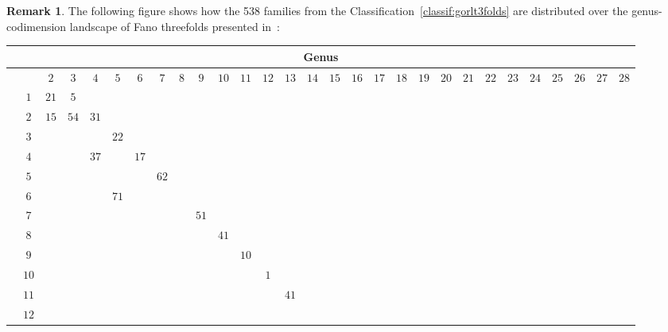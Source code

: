 \documentclass[pdftex]{sigma}%
\theoremstyle{definition}
\newtheorem{rema}[thm]{Remark}
\numberwithin{equation}{section}
\begin{document}
\begin{rema}
The following figure shows how the 538 families from
the Classification~\ref{classif:gorlt3folds} are
distributed over the genus-codimension landscape of
Fano threefolds presented in~\cite[Figure~1]{BrKa}:\vspace{-5ex}
\begin{table}[h!]\centering
\small\setlength{\tabcolsep}{1.5pt} \setlength{\arraycolsep}{0pt}
	\begin{longtable}{c|c|ccccc|ccccc|ccccc|ccccc|ccccc|cc}\hline
	\multicolumn{29}{c}{Genus}
	\\ \hline
	\multirow{24}{*}{\rotatebox[origin=c]{90}{Codimension}}
\qquad	& &${ 2}$ &${ 3}$ &${ 4}$ &${ 5}$ &${ 6}$ & ${ 7}$ &${ 8}$ &${ 9}$ &${ 10}$ &${ 11}$ &${ 12}$ &${ 13}$ &${ 14}$ &${ 15}$ &${ 16}$ &${ 17}$ &${ 18}$ &${ 19}$ &${ 20}$ &${ 21}$ &${ 22}$ &${ 23}$ &${ 24}$ &${ 25}$ &${ 26}$ &${ 27}$ &${ 28}$
	\\
	\cline{2-29}
	&${ 1}$ & \hyperref[T(1,2)]{${ 21}$} &\hyperref[T(1,3)]{${ 5}$} & & & & & & & & & & & & & & & & & & & & & & & & &
	\\
	&${ 2}$ &\hyperref[T(2,2)]{${ 15}$} & \hyperref[T(2,3)]{${ 54}$} & \hyperref[T(2,4)]{${ 31}$} & & & & & & & & & & & & & & & & & & & & & & & &
	\\
	&${ 3}$ & & & & \hyperref[T(3,5)]{${ 22}$} & & & & & & & & & & & & & & & & & & & & & & &
	\\
	&${ 4}$ & & & \hyperref[T(4,4)]{${ 37}$} & & \hyperref[T(4,6)]{${ 17}$} & & & & & & & & & & & & & & & & & & & & & &
	\\
	&${ 5}$ & & & & & & \hyperref[T(5,7)]{${ 62}$} & & & & & & & & & & & & & & & & & & & & &
	\\
	&${ 6}$ & & & & \hyperref[T(6,5)]{${ 71}$} & & & & & & & & & & & & & & & & & & & & & & &
	\\
	&${ 7}$ & & & & & & & & \hyperref[T(7,9)]{${ 51}$} & & & & & & & & & & & & & & & & & & &
	\\
	\cline{2-29}
	&${ 8}$ & & & & & & & & & \hyperref[T(8,10)]{${ 41}$} & & & & & & & & & & & & & & & & & &
	\\
	&${ 9}$ & & & & & & & & & & \hyperref[T(9,11)]{${ 10}$} & & & & & & & & & & & & & & & & &
	\\
	&${ 10}$ & & & & & & & & & & & \hyperref[T(10,12)]{${ 1}$} & & & & & & & & & & & & & & & &
	\\
	&${ 11}$ & & & & & & & & & & & & \hyperref[T(11,13)]{${ 41}$} & & & & & & & & & & & & & & &
	\\
	&${ 12}$ & & & & & & & & & & & & & & & & & & & & & & & & & & &

\end{longtable}
\end{table}
\end{rema}
\end{document}
